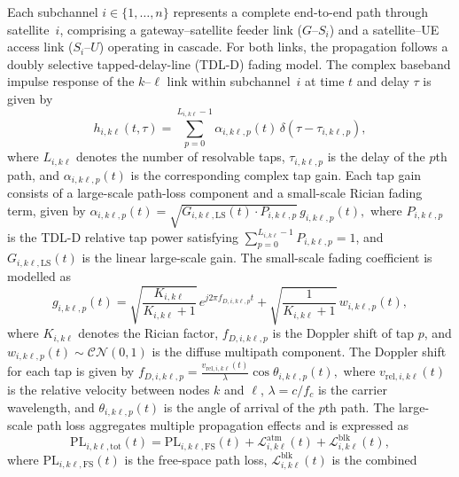 \documentclass[lettersize,journal]{IEEEtran}
\begin{document}
Each subchannel $i \in \{1,\ldots,n\}$ represents a complete end-to-end path through satellite~$i$, comprising a gateway--satellite feeder link ($G$--$S_i$) and a satellite--UE access link ($S_i$--$U$) operating in cascade. For both links, the propagation follows a doubly selective  tapped-delay-line (TDL-D) fading model. The complex baseband impulse response of the $k$--$\ell$ link within subchannel~$i$ at time $t$ and delay $\tau$ is given by
\begin{equation}
h_{i,k\ell}(t,\tau) = \sum_{p=0}^{L_{i,k\ell}-1} \alpha_{i,k\ell,p}(t)\, \delta(\tau-\tau_{i,k\ell,p}),
\label{eq:ntn_impulse_response}
\end{equation}
where $L_{i,k\ell}$ denotes the number of resolvable taps, $\tau_{i,k\ell,p}$ is the delay of the $p$th path, and $\alpha_{i,k\ell,p}(t)$ is the corresponding complex tap gain. Each tap gain consists of a large-scale path-loss component and a  small-scale Rician fading term, given by
$ \alpha_{i,k\ell,p}(t) = \sqrt{G_{i,k\ell,\mathrm{LS}}(t) \cdot P_{i,k\ell,p}}\, g_{i,k\ell,p}(t),
$ where $P_{i,k\ell,p}$ is the TDL-D relative tap power satisfying 
$\sum_{p=0}^{L_{i,k\ell}-1} P_{i,k\ell,p} = 1$, and 
$G_{i,k\ell,\mathrm{LS}}(t)$ is the linear large-scale gain. The small-scale fading coefficient is modelled as
\begin{equation}
g_{i,k\ell,p}(t) = \sqrt{\frac{K_{i,k\ell}}{K_{i,k\ell}+1}}\, 
e^{j2\pi f_{D,i,k\ell,p}t} + \sqrt{\frac{1}{K_{i,k\ell}+1}}\, 
w_{i,k\ell,p}(t),
\label{eq:rician_fading}
\end{equation}
where $K_{i,k\ell}$ denotes the Rician factor, $f_{D,i,k\ell,p}$ 
is the Doppler shift of tap $p$, and 
$w_{i,k\ell,p}(t)\sim\mathcal{CN}(0,1)$ is the diffuse multipath 
component. The Doppler shift for each tap is given by
$ f_{D,i,k\ell,p} = \frac{v_{\mathrm{rel},i,k\ell}(t)}{\lambda} 
\cos\theta_{i,k\ell,p}(t),
$
where $v_{\mathrm{rel},i,k\ell}(t)$ is the relative velocity 
between nodes $k$ and $\ell$, $\lambda = c/f_c$ is the carrier 
wavelength, and $\theta_{i,k\ell,p}(t)$ is the angle of arrival 
of the $p$th path. The large-scale path loss aggregates multiple propagation effects  and is expressed as
\begin{equation}
\mathrm{PL}_{i,k\ell,\mathrm{tot}}(t) = \mathrm{PL}_{i,k\ell,\mathrm{FS}}(t) 
+ \mathcal{L}_{i,k\ell}^{\mathrm{atm}}(t) 
+ \mathcal{L}_{i,k\ell}^{\mathrm{blk}}(t),
\label{eq:total_path_loss}
\end{equation}
where $\mathrm{PL}_{i,k\ell,\mathrm{FS}}(t)$ is the free-space path 
loss, $\mathcal{L}_{i,k\ell}^{\mathrm{blk}}(t)$ is the combined 
\end{document}
